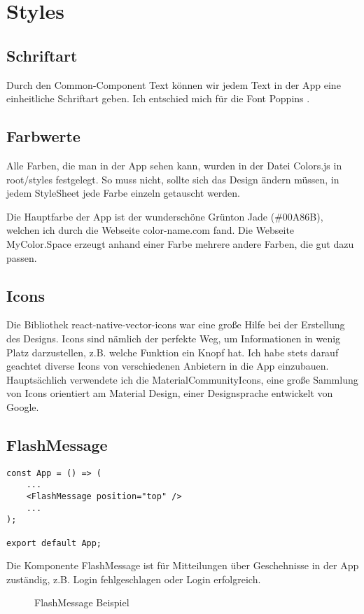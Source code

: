\section{Styles}
\subsection{Schriftart}
Durch den Common-Component Text können wir jedem Text in der App eine einheitliche Schriftart geben.
Ich entschied mich für die Font Poppins \cite{poppins}.

\subsection{Farbwerte}
Alle Farben, die man in der App sehen kann, wurden in der Datei Colors.js in root/styles festgelegt.
So muss nicht, sollte sich das Design ändern müssen, in jedem StyleSheet jede Farbe einzeln
getauscht werden.

Die Hauptfarbe der App ist der wunderschöne Grünton Jade (\#00A86B), welchen ich durch die Webseite
color-name.com \cite{colorName} fand. Die Webseite MyColor.Space \cite{myColorSpace} erzeugt anhand
einer Farbe mehrere andere Farben, die gut dazu passen.

\subsection{Icons}
Die Bibliothek react-native-vector-icons \cite{reactNativeVectorIcons} war eine große Hilfe bei der
Erstellung des Designs. Icons sind nämlich der perfekte Weg, um Informationen in wenig Platz
darzustellen, z.B. welche Funktion ein Knopf hat. Ich habe stets darauf geachtet diverse Icons von
verschiedenen Anbietern in die App einzubauen. Hauptsächlich verwendete ich die
MaterialCommunityIcons, eine große Sammlung von Icons orientiert am Material Design, einer
Designsprache entwickelt von Google.

\subsection{FlashMessage}
\begin{lstlisting}
const App = () => (
    ...
    <FlashMessage position="top" />
    ...
);

export default App;
\end{lstlisting}

Die Komponente FlashMessage ist für Mitteilungen über Geschehnisse in der App zuständig, z.B.
Login fehlgeschlagen oder Login erfolgreich.

\begin{figure}[H]
  \centering
  \hfill
  \hfill
  \hfill
  \caption{FlashMessage Beispiel}
\end{figure}